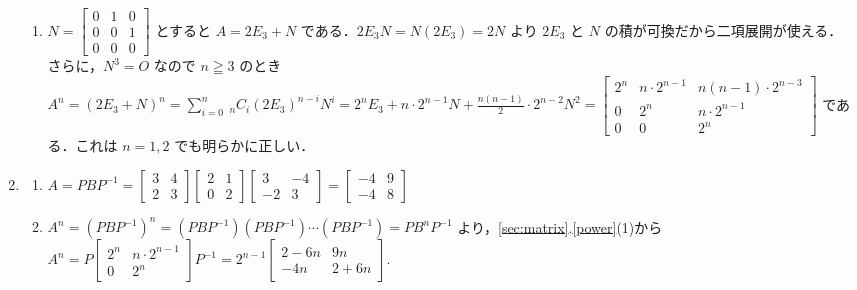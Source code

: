 \documentclass[11pt, uplatex, dvipdfmx]{jsarticle}
\newcommand*{\ds}{\displaystyle}
\begin{document}
\begin{enumerate}
\begin{enumerate}[(1)]
  \item $N=\left[
      \begin{array}{ccc}
        0 & 1 & 0\\
        0 & 0 & 1\\
        0 & 0 & 0
      \end{array}
    \right]$ とすると $A=2E_3+N$ である．$2E_3N =
    N(2E_3)=2N$ より $2E_3$ と $N$ の積が可換だから二項展開が使える．
    さらに，$N^3=O$ なので $n \geqq 3$ のとき
    $A^n = (2E_3+N)^n = {\ds \sum_{i=0}^{n}}~ {}_n C_{i}
    (2E_3)^{n-i} N^i = 2^{n} E_3 + n \cdot 2^{n-1}N +
    \frac{n(n-1)}{2} \cdot 2^{n-2} N^2=\left[
      \begin{array}{ccc}
        2^n & n \cdot 2^{n-1} & n(n-1)\cdot 2^{n-3}\\
        0 & 2^n & n \cdot 2^{n-1}\\
        0 & 0 & 2^n
      \end{array}
    \right]$ である．これは $n=1,2$ でも明らかに正しい．
    
  \end{enumerate}

\item
  \begin{enumerate}[(1)]
    \setlength{\itemsep}{1ex}
    
  \item $A=PBP^{-1} = \left[
      \begin{array}{rr}
        3 & 4\\
        2 & 3
      \end{array}
    \right] \left[
      \begin{array}{rr}
        2 & 1\\
        0 & 2
      \end{array}
    \right] \left[
      \begin{array}{rr}
        3 & -4\\
        -2 & 3
      \end{array}
    \right] = \left[
      \begin{array}{rr}
        -4 & 9\\
        -4 & 8
      \end{array}
    \right]$
    
  \item
    $A^n = (PBP^{-1})^n = (PBP^{-1})(PBP^{-1}) \cdots (PBP^{-1}) =
    PB^n P^{-1}$ より，\ref{sec:matrix}.\ref{power}(1)から $A^n = P \left[
      \begin{array}{cc}
        2^n & n\cdot 2^{n-1}\\
        0 & 2^n
      \end{array}
    \right]P^{-1} = 2^{n-1} \left[
      \begin{array}{cc}
        2-6n & 9n\\
        -4n & 2+6n
      \end{array}
    \right]$.
  \end{enumerate}


\end{enumerate}
\end{document}
